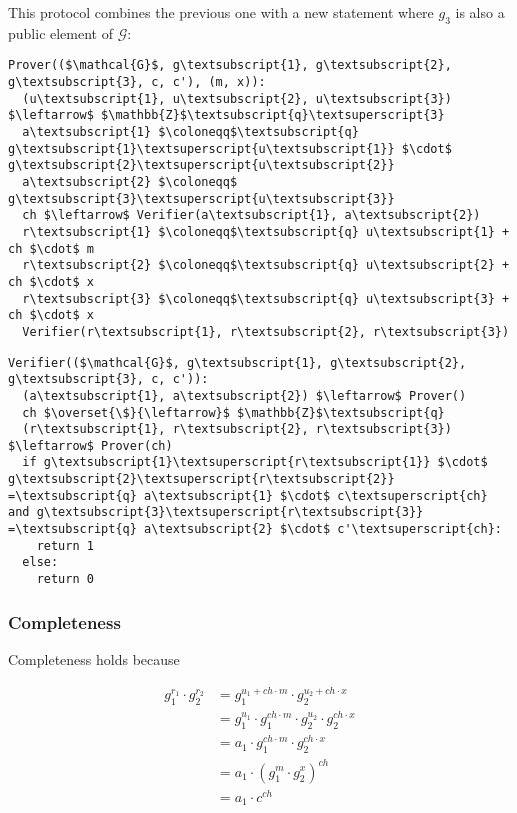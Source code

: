 \documentclass{article}
\begin{document}
This protocol combines the previous one with a new statement where $g_3$ 
is also a public element of $\mathcal{G}$:

\begin{Verbatim}[commandchars=\\\{\},codes={\catcode`$=3\catcode`_=8}]
Prover(($\mathcal{G}$, g\textsubscript{1}, g\textsubscript{2}, g\textsubscript{3}, c, c'), (m, x)):
  (u\textsubscript{1}, u\textsubscript{2}, u\textsubscript{3}) $\leftarrow$ $\mathbb{Z}$\textsubscript{q}\textsuperscript{3}
  a\textsubscript{1} $\coloneqq$\textsubscript{q} g\textsubscript{1}\textsuperscript{u\textsubscript{1}} $\cdot$ g\textsubscript{2}\textsuperscript{u\textsubscript{2}}
  a\textsubscript{2} $\coloneqq$ g\textsubscript{3}\textsuperscript{u\textsubscript{3}}
  ch $\leftarrow$ Verifier(a\textsubscript{1}, a\textsubscript{2})
  r\textsubscript{1} $\coloneqq$\textsubscript{q} u\textsubscript{1} + ch $\cdot$ m
  r\textsubscript{2} $\coloneqq$\textsubscript{q} u\textsubscript{2} + ch $\cdot$ x
  r\textsubscript{3} $\coloneqq$\textsubscript{q} u\textsubscript{3} + ch $\cdot$ x
  Verifier(r\textsubscript{1}, r\textsubscript{2}, r\textsubscript{3})
\end{Verbatim}

\begin{Verbatim}[commandchars=\\\{\},codes={\catcode`$=3\catcode`_=8}]
Verifier(($\mathcal{G}$, g\textsubscript{1}, g\textsubscript{2}, g\textsubscript{3}, c, c')):
  (a\textsubscript{1}, a\textsubscript{2}) $\leftarrow$ Prover()
  ch $\overset{\$}{\leftarrow}$ $\mathbb{Z}$\textsubscript{q}
  (r\textsubscript{1}, r\textsubscript{2}, r\textsubscript{3}) $\leftarrow$ Prover(ch)
  if g\textsubscript{1}\textsuperscript{r\textsubscript{1}} $\cdot$ g\textsubscript{2}\textsuperscript{r\textsubscript{2}} =\textsubscript{q} a\textsubscript{1} $\cdot$ c\textsuperscript{ch} and g\textsubscript{3}\textsuperscript{r\textsubscript{3}} =\textsubscript{q} a\textsubscript{2} $\cdot$ c'\textsuperscript{ch}:
    return 1
  else:
    return 0
\end{Verbatim}

\subsubsection{Completeness}

Completeness holds because

\begin{align*}
  g_1^{r_1} \cdot g_2^{r_2} 
    &= g_1^{u_1 + ch \cdot m} \cdot g_2^{u_2 + ch \cdot x} \\
    &= g_1^{u_1} \cdot g_1^{ch \cdot m} \cdot g_2^{u_2} \cdot g_2^{ch \cdot x} \\
    &= a_1 \cdot g_1^{ch \cdot m} \cdot g_2^{ch \cdot x} \\
    &= a_1 \cdot (g_1^{m} \cdot g_2^{x})^{ch} \\
    &= a_1 \cdot c^{ch} \\
\end{align*}
\end{document}
